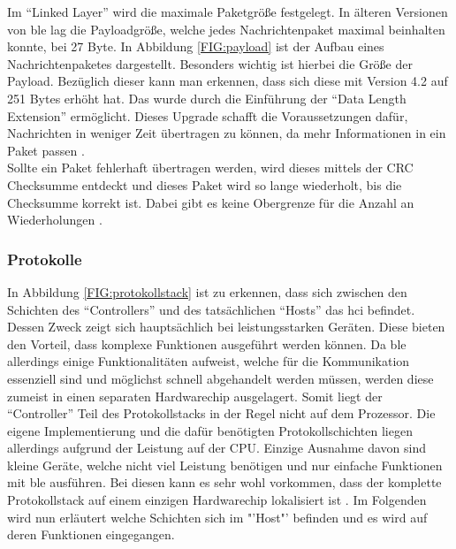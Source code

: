 \noindent Im "`Linked Layer"' wird die maximale Paketgröße festgelegt. In älteren Versionen von \ac{ble} lag die Payloadgröße, welche jedes Nachrichtenpaket maximal beinhalten konnte, bei 27 Byte. In Abbildung \ref{FIG:payload} ist der Aufbau eines Nachrichtenpaketes dargestellt. Besonders wichtig ist hierbei die Größe der Payload. Bezüglich dieser kann man erkennen, dass sich diese mit Version 4.2 auf 251 Bytes erhöht hat. Das wurde durch die Einführung der "`Data Length Extension"' ermöglicht. Dieses Upgrade schafft die Voraussetzungen dafür, Nachrichten in weniger Zeit übertragen zu können, da mehr Informationen in ein Paket passen \cite{Gupta:WWW}.\\   

\noindent Sollte ein Paket fehlerhaft übertragen werden, wird dieses mittels der CRC Checksumme entdeckt und dieses Paket wird so lange wiederholt, bis die Checksumme korrekt ist. Dabei gibt es keine Obergrenze für die Anzahl an Wiederholungen \cite[Seite 23]{Townsend14:GSB}.\\

\subsubsection{Protokolle}
\label{sss:funktionsweise:protocoll}

In Abbildung \ref{FIG:protokollstack} ist zu erkennen, dass sich zwischen den Schichten des "`Controllers"' und des tatsächlichen "`Hosts"' das \ac{hci} befindet. Dessen Zweck zeigt sich hauptsächlich bei leistungsstarken Geräten. Diese bieten den Vorteil, dass komplexe Funktionen ausgeführt werden können. Da \ac{ble} allerdings einige Funktionalitäten aufweist, welche für die Kommunikation essenziell sind und möglichst schnell abgehandelt werden müssen, werden diese zumeist in einen separaten Hardwarechip ausgelagert. Somit liegt der "`Controller"' Teil des Protokollstacks in der Regel nicht auf dem Prozessor. Die eigene Implementierung und die dafür benötigten Protokollschichten liegen allerdings aufgrund der Leistung auf der CPU. Einzige Ausnahme davon sind kleine Geräte, welche nicht viel Leistung benötigen und nur einfache Funktionen mit \ac{ble} ausführen. Bei diesen kann es sehr wohl vorkommen, dass der komplette Protokollstack auf einem einzigen Hardwarechip lokalisiert ist \cite[Seite 24]{Townsend14:GSB}. Im Folgenden wird nun erläutert welche Schichten sich im "'Host"' befinden und es wird auf deren Funktionen eingegangen.\\  


